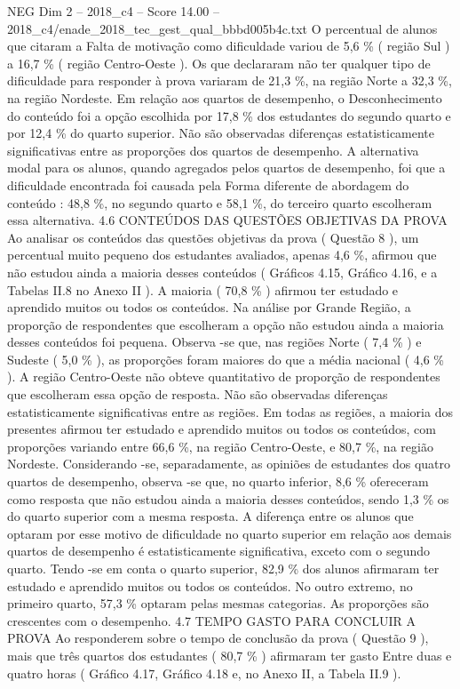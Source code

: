 \begin{textsample}{NEG Dim 2 – 2018\_c4 – Score 14.00 – 2018\_c4/enade\_2018\_tec\_gest\_qual\_bbbd005b4c.txt}
O percentual de alunos que citaram a Falta de motivação como dificuldade variou de 5,6 \% ( região Sul ) a 16,7 \% ( região Centro-Oeste ).
Os que declararam não ter qualquer tipo de dificuldade para responder à prova variaram de 21,3 \%, na região Norte a 32,3 \%, na região Nordeste.
Em relação aos quartos de desempenho, o Desconhecimento do conteúdo foi a opção escolhida por 17,8 \% dos estudantes do segundo quarto e por 12,4 \% do quarto superior.
Não são observadas diferenças estatisticamente significativas entre as proporções dos quartos de desempenho.
A alternativa modal para os alunos, quando agregados pelos quartos de desempenho, foi que a dificuldade encontrada foi causada pela Forma diferente de abordagem do conteúdo : 48,8 \%, no segundo quarto e 58,1 \%, do terceiro quarto escolheram essa alternativa. 4.6 CONTEÚDOS DAS QUESTÕES OBJETIVAS DA PROVA Ao analisar os conteúdos das questões objetivas da prova ( Questão 8 ), um percentual muito pequeno dos estudantes avaliados, apenas 4,6 \%, afirmou que não estudou ainda a maioria desses conteúdos ( Gráficos 4.15, Gráfico 4.16, e a Tabelas II.8 no Anexo II ).
A maioria ( 70,8 \% ) afirmou ter estudado e aprendido muitos ou todos os conteúdos.
Na análise por Grande Região, a proporção de respondentes que escolheram a opção não estudou ainda a maioria desses conteúdos foi pequena.
Observa -se que, nas regiões Norte ( 7,4 \% ) e Sudeste ( 5,0 \% ), as proporções foram maiores do que a média nacional ( 4,6 \% ).
A região Centro-Oeste não obteve quantitativo de proporção de respondentes que escolheram essa opção de resposta.
Não são observadas diferenças estatisticamente significativas entre as regiões.
Em todas as regiões, a maioria dos presentes afirmou ter estudado e aprendido muitos ou todos os conteúdos, com proporções variando entre 66,6 \%, na região Centro-Oeste, e 80,7 \%, na região Nordeste.
Considerando -se, separadamente, as opiniões de estudantes dos quatro quartos de desempenho, observa -se que, no quarto inferior, 8,6 \% ofereceram como resposta que não estudou ainda a maioria desses conteúdos, sendo 1,3 \% os do quarto superior com a mesma resposta.
A diferença entre os alunos que optaram por esse motivo de dificuldade no quarto superior em relação aos demais quartos de desempenho é estatisticamente significativa, exceto com o segundo quarto.
Tendo -se em conta o quarto superior, 82,9 \% dos alunos afirmaram ter estudado e aprendido muitos ou todos os conteúdos.
No outro extremo, no primeiro quarto, 57,3 \% optaram pelas mesmas categorias.
As proporções são crescentes com o desempenho. 4.7 TEMPO GASTO PARA CONCLUIR A PROVA Ao responderem sobre o tempo de conclusão da prova ( Questão 9 ), mais que três quartos dos estudantes ( 80,7 \% ) afirmaram ter gasto Entre duas e quatro horas ( Gráfico 4.17, Gráfico 4.18 e, no Anexo II, a Tabela II.9 ).

\end{textsample}

